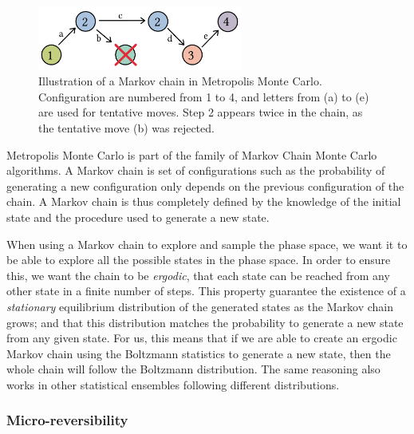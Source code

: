 \documentclass[thesis]{subfiles}
\begin{document}
\begin{figure}[ht]
    \centering
    \includegraphics[width=0.6\textwidth]{figures/images/mc-chain}
    \caption{Illustration of a Markov chain in Metropolis Monte Carlo.
    Configuration are numbered from 1 to 4, and letters from (a) to (e) are used
    for tentative moves. Step 2 appears twice in the chain, as the tentative
    move (b) was rejected.}
    \label{fig:mc:chain}
\end{figure}

Metropolis Monte Carlo is part of the family of Markov Chain Monte Carlo
algorithms. A Markov chain is set of configurations such as the probability of
generating a new configuration only depends on the previous configuration of the
chain. A Markov chain is thus completely defined by the knowledge of the initial
state and the procedure used to generate a new state.

When using a Markov chain to explore and sample the phase space, we want it to
be able to explore all the possible states in the phase space. In order to
ensure this, we want the chain to be \emph{ergodic}, \ie that each state can be
reached from any other state in a finite number of steps. This property
guarantee the existence of a \emph{stationary} equilibrium distribution of the
generated states as the Markov chain grows; and that this distribution matches
the probability to generate a new state from any given state. For us, this means
that if we are able to create an ergodic Markov chain using the Boltzmann
statistics to generate a new state, then the whole chain will follow the
Boltzmann distribution. The same reasoning also works in other statistical
ensembles following different distributions.

\subsubsection{Micro-reversibility}
\end{document}
